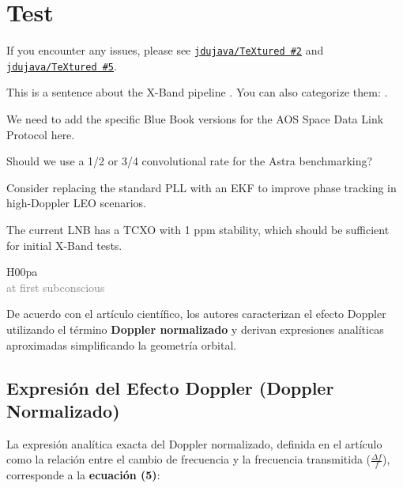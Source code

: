 \chapter{Test} \label{ch:Test}

\newpage
{}
\autocite{TeXtured}
If you encounter any issues, please see \href{https://github.com/jdujava/TeXtured/issues/2}{\texttt{jdujava/TeXtured \#2}} and \href{https://github.com/jdujava/TeXtured/issues/5}{\texttt{jdujava/TeXtured \#5}}.


This is a sentence about the X-Band pipeline . 
You can also categorize them: .

\begin{Todo}
    We need to add the specific Blue Book versions for the AOS Space Data Link Protocol here.
\end{Todo}

\begin{Question}
    Should we use a 1/2 or 3/4 convolutional rate for the Astra benchmarking?
\end{Question}

\begin{Suggestion}[Optimization]
    Consider replacing the standard PLL with an EKF to improve phase tracking in high-Doppler LEO scenarios.
\end{Suggestion}

\begin{Note}
    The current LNB has a TCXO with 1 ppm stability, which should be sufficient for initial X-Band tests.
\end{Note}

H00pa \\\textcolor{gray}{at first subconscious}


\autocite[pág. 20]{CCSDS_131_0_B_5}

\newpage
De acuerdo con el artículo científico, los autores caracterizan el efecto Doppler utilizando el término \textbf{Doppler normalizado} y derivan expresiones analíticas aproximadas simplificando la geometría orbital.

\section{Expresión del Efecto Doppler (Doppler Normalizado)}

La expresión analítica exacta del Doppler normalizado, definida en el artículo como la relación entre el cambio de frecuencia y la frecuencia transmitida ($\frac{\Delta f}{f}$), corresponde a la \textbf{ecuación (5)}:

